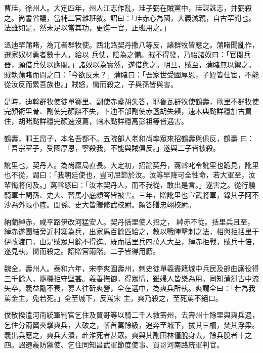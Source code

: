 \begin{pinyinscope}
 曹珪，徐州人。大定四年，州人江志作亂，珪子弼在賊黨中，珪謀誅志，并弼殺之。尚書省議，當補二官雜班敘。詔曰：「珪赤心為國，大義滅親，自古罕聞也。法雖如是，然未足以當其功，更進一官，正班用之。」



 溫迪罕蒲睹，為兀者群牧使。西北路契丹撒八等反，諸群牧皆應之。蒲睹聞亂作，選家奴材勇者數十人，給以
 兵仗，陰為之備。賊不得發，乃紿諸奴曰：「官閱兵器，願借兵仗以應閱。」諸奴以為實然，遂借與之。明旦，賊至，蒲睹無以禦之。賊執蒲睹而問之曰：「今欲反未？」蒲睹曰：「吾家世受國厚恩，子姪皆仕宦，不能從汝反而累吾族也。」賊怒，臠而殺之，子與孫皆與害。



 是時，迪斡群牧使徒單賽里、副使赤盞胡失答，耶魯瓦群牧使鶴壽，歐里不群牧使完顏術里骨、副使完顏辭不失，卜迪不部副使赤盞胡失賴，速木典颭詳穩加古買住，胡睹颭詳穩完顏速沒葛，轄木颭詳穩高彭祖等皆遇害。



 鶴壽，鄆王昂子，本名吾都不。五院部人老和尚率眾來招鶴壽與俱反，鶴壽
 曰：「吾宗室子，受國厚恩，寧殺我，不能與賊俱反。」遂與二子皆被殺。



 訛里也，契丹人。為尚廄局直長。大定初，招諭契丹，窩斡叱令訛里也跪見，訛里也不從，謂曰：「我朝廷使也，豈可屈節於汝。汝等早降可全性命，若大軍至，汝輩悔將何及。」窩斡怒曰：「汝本契丹人，而不我從，敢出是言。」遂害之。從行驍騎軍士閏孫、史大、習馬小底頗答皆被害。三年，贈訛里也宣武將軍，錄其子阿不沙為外帳小底。閏孫、史大皆贈修武校尉。頗答贈忠翊校尉。



 納蘭綽赤，咸平路伊改河猛安人。契丹括里使人招之，
 綽赤不從。括里兵且至，綽赤遂團結旁近村寨為兵，出家馬百餘匹給之，教以戰陣擊刺之法，相與拒括里于伊改渡口，由是賊眾月餘不得進。既而括里兵四萬人大至，綽赤拒戰，賊兵十倍，遂見執，臠而殺之。詔贈官兩階，二子皆得用廕。



 魏全，壽州人。泰和六年，宋李爽圍壽州，刺史徒單羲盡籍城中兵民及部曲廝役得三千餘人，隨機拒守堅甚。羲善撫御，得眾情，雖婦人皆樂為用。同知蒲烈古中流矢卒，羲益勵不衰，募人往斫爽營，全在選中，為爽兵所執。爽謂全曰：「若為我罵金主，免若死。」全至城下，反罵宋
 主，爽乃殺之，至死罵不絕口。



 僕散揆遣河南統軍判官乞住及買哥等以騎二千人救壽州，去壽州十餘里與爽兵遇，乞住分兩翼夾擊爽兵，大破之，斬首萬餘級，追奔至城下，拔其三柵，焚其浮梁。羲出兵應之，爽兵大潰，赴淮死者甚眾。爽與其副田林僅脫身去，餘兵脫者十之四。詔遷羲防禦使、乞住同知昌武軍節度使事、買哥河南路統軍判官。




\end{pinyinscope}
